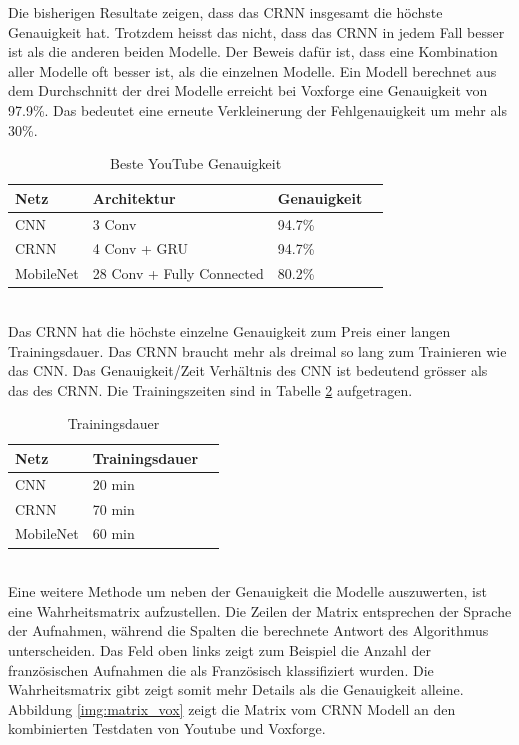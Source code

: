Die bisherigen Resultate zeigen, dass das CRNN insgesamt die höchste Genauigkeit hat. Trotzdem heisst das nicht, dass das CRNN in jedem Fall besser ist als die anderen beiden Modelle. Der Beweis dafür ist, dass eine Kombination aller Modelle oft besser ist, als die einzelnen Modelle. Ein Modell berechnet aus dem Durchschnitt der drei Modelle erreicht bei Voxforge eine Genauigkeit von 97.9\%. Das bedeutet eine erneute Verkleinerung der Fehlgenauigkeit um mehr als 30\%.
\begin{table}[h]
	\centering
	\begin{tabular}{llll}
		\hline
		Netz & Architektur     & Genauigkeit  \\ \hline
		CNN  & 3 Conv          & 94.7\%       \\
		CRNN & 4 Conv + GRU   & 94.7\%     \\
		MobileNet  & 28 Conv + Fully Connected & 80.2\%   \\ \hline
	\end{tabular}
	\caption{Beste YouTube Genauigkeit}
	\label{table:test_you}
\end{table}
\\
Das CRNN hat die höchste einzelne Genauigkeit zum Preis einer langen Trainingsdauer. Das CRNN braucht mehr als dreimal so lang zum Trainieren wie das CNN. Das Genauigkeit/Zeit Verhältnis des CNN ist bedeutend grösser als das des CRNN. Die Trainingszeiten sind in Tabelle \ref{table:test_time} aufgetragen.
\begin{table}[h]
	\centering
	\begin{tabular}{lll}
		\hline
		Netz & Trainingsdauer \\ \hline
		CNN  & 20 min \\
		CRNN & 70 min \\
		MobileNet  & 60 min\\ \hline
	\end{tabular}
	\caption{Trainingsdauer}
	\label{table:test_time}
\end{table}
\\
Eine weitere Methode um neben der Genauigkeit die Modelle auszuwerten, ist eine Wahrheitsmatrix aufzustellen. Die Zeilen der Matrix entsprechen der Sprache der Aufnahmen, während die Spalten die berechnete Antwort des Algorithmus unterscheiden. Das Feld oben links zeigt zum Beispiel die Anzahl der französischen Aufnahmen die als Französisch klassifiziert wurden. Die Wahrheitsmatrix gibt zeigt somit mehr Details als die Genauigkeit alleine. Abbildung \ref{img:matrix_vox} zeigt die Matrix vom CRNN Modell an den kombinierten Testdaten von Youtube und Voxforge.
